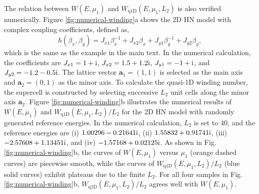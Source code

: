 The relation between $W(E,\mu_{1})$ and $W_{\text{q1D}}(E,\mu_{1},L_{2})$
is also verified numerically. Figure \ref{fig:numerical-winding}a
shows the 2D HN model with complex coupling coefficients, defined
as, 
\begin{equation}
h\left(\beta_{x},\beta_{y}\right)=J_{x1}\beta_{x}^{-1}+J_{x2}\beta_{x}+J_{y1}\beta_{y}^{-1}+J_{y2}\beta_{y},
\end{equation}
which is the same as the example in the main text. In the numerical
calculation, the coefficients are $J_{x1}=1+\mathrm{i}$, $J_{x2}=1.5+1.2\mathrm{i}$,
$J_{y1}=-1+\mathrm{i}$, and $J_{y2}=-1.2-0.5\mathrm{i}$. The lattice vector
$\mathbf{a}_{1}=(1,1)$ is selected as the main axis and $\mathbf{a}_{2}=(0,1)$
as the minor axis. To calculate the quasi-1D winding number, the supercell
is constructed by selecting successive $L_{2}$ unit cells along the
minor axis $\mathbf{a}_{2}$. Figure \ref{fig:numerical-winding}b
illustrates the numerical results of $W(E,\mu_{1})$ and $W_{\text{q1D}}(E,\mu_{1},L_{2})/L_{2}$
for the 2D HN model with randomly generated reference energies. In
the numerical calculation, $L_{2}$ is set to $40$, and the reference
energies are (i) $1.00296-0.21641\mathrm{i}$, (ii) $1.55832+0.91741\mathrm{i}$,
(iii) $-2.57608+1.13451\mathrm{i}$, and (iv) $-1.57168+0.02125\mathrm{i}$. As
shown in Fig. \ref{fig:numerical-winding}b, the curves of $W(E,\mu_{1})$
versus $\mu_{1}$ (orange dashed curves) are piecewise smooth, while
the curves of $W_{\text{q1D}}(E,\mu_{1},L_{2})/L_{2}$ (blue solid
curves) exhibit plateaus due to the finite $L_{2}$. For all four
samples in Fig. \ref{fig:numerical-winding}b, $W_{\text{q1D}}(E,\mu_{1},L_{2})/L_{2}$
agrees well with $W(E,\mu_{1})$.

